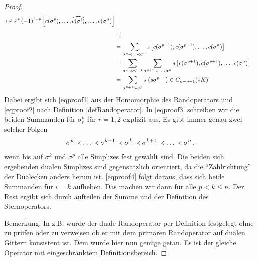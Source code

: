 \begin{proof}
{\begin{align}
{\begin{smallmatrix}
                                                  i & \neq & k
                                                \end{smallmatrix}}^{n} (-1)^{i-p} \left[ c(\sigma^{p}),\ldots, \widehat{c(\sigma^{i})},\ldots, c(\sigma^{n})\right] \label{eqproof4}\\
                              &\hphantom{=}\vdots\notag\\
                              &= \sum_{\sigma^{p}\prec\ldots\prec\sigma^{n}} s \left[ c(\sigma^{p+1}), c(\sigma^{p+1}),\ldots, c(\sigma^{n})\right]  \label{eqproof5}\\
                              &= \sum_{\sigma^{p}\prec\sigma^{p+1}}
                                          \sum_{\sigma^{p+1}\prec\ldots\prec\sigma^{n}} s \left[ c(\sigma^{p+1}), c(\sigma^{p+1}),\ldots, c(\sigma^{n})\right]  \label{eqproof5}\\
                              &= \sum_{\sigma^{p+1} \succ \sigma^{p}} \star \left( s \sigma^{p+1} \right) \in C_{n-p-1}(\star K)
    \end{align}}
    Dabei ergibt sich \eqref{eqproof1} aus der Homomorphie des Randoperators und \eqref{eqproof2} nach Definition \ref{defRandoperator}.
    In \eqref{eqproof3} schreiben wir die beiden Summanden für \( \sigma^{k}_{r} \) für \( r = 1,2 \) explizit aus. 
    Es gibt immer genau zwei solcher Folgen 
    \begin{align}
      \sigma^{p}\prec\ldots\prec\sigma^{k-1}\prec\sigma^{k}\prec\sigma^{k+1}\prec\ldots\prec\sigma^{n}\,\text{,}
    \end{align}
    wenn bis auf \( \sigma^{k} \) und \( \sigma^{p} \) alle Simplizes fest gewählt sind. 
    Die beiden sich ergebenden dualen Simplizes sind gegensätzlich orientiert, da die "`Zählrichtung"' der Dualecken anders herum ist.
    \eqref{eqproof4} folgt daraus, dass sich beide Summanden für \( i=k \) aufheben. 
    Das machen wir dann für alle \( p < k \le n \).
    Der Rest ergibt sich durch aufteilen der Summe und der Definition des Sternoperators.

    Bemerkung:
    In z.B. \cite{hirani} wurde der duale Randoperator per Definition festgelegt ohne zu prüfen oder zu verweisen 
    ob er mit dem primären Randoperator auf dualen Gittern konsistent ist.
    Dem wurde hier nun genüge getan. Es ist der gleiche Operator mit eingeschränktem Definitionsbereich.
  \end{proof}

